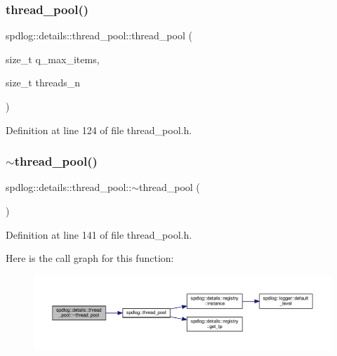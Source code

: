 \subsubsection{\texorpdfstring{thread\+\_\+pool()}{thread\_pool()}\hspace{0.1cm}{\footnotesize\ttfamily [1/2]}}
{\footnotesize\ttfamily spdlog\+::details\+::thread\+\_\+pool\+::thread\+\_\+pool (\begin{DoxyParamCaption}\item[{size\+\_\+t}]{q\+\_\+max\+\_\+items,  }\item[{size\+\_\+t}]{threads\+\_\+n }\end{DoxyParamCaption})\hspace{0.3cm}{\ttfamily [inline]}}



Definition at line 124 of file thread\+\_\+pool.\+h.

\mbox{\label{classspdlog_1_1details_1_1thread__pool_a27e41d821a8aa8137bc0e64df031ccd4}} 
\subsubsection{\texorpdfstring{$\sim$thread\+\_\+pool()}{~thread\_pool()}}
{\footnotesize\ttfamily spdlog\+::details\+::thread\+\_\+pool\+::$\sim$thread\+\_\+pool (\begin{DoxyParamCaption}{ }\end{DoxyParamCaption})\hspace{0.3cm}{\ttfamily [inline]}}



Definition at line 141 of file thread\+\_\+pool.\+h.

Here is the call graph for this function\+:
\nopagebreak
\begin{figure}[H]
\begin{center}
\leavevmode
\includegraphics[width=350pt]{classspdlog_1_1details_1_1thread__pool_a27e41d821a8aa8137bc0e64df031ccd4_cgraph}
\end{center}
\end{figure}
\mbox{\label{classspdlog_1_1details_1_1thread__pool_a5e8f86d40f81af1d22a21ee0368287b2}} 
